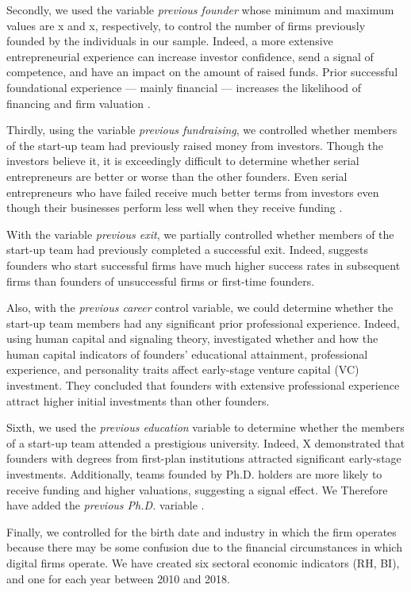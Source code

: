 \documentclass[12pt]{article}
\begin{document}
Secondly, we used the variable \textit{previous founder} whose minimum and maximum values are x and x, respectively, to control the number of firms previously founded by the individuals in our sample. Indeed, a more extensive entrepreneurial experience can increase investor confidence, send a signal of competence, and have an impact on the amount of raised funds. Prior successful foundational experience — mainly financial — increases the likelihood of financing and firm valuation \citep{hsu2007experienced}.

Thirdly, using the variable \textit{previous fundraising}, we controlled whether members of the start-up team had previously raised money from investors. Though the investors believe it, it is exceedingly difficult to determine whether serial entrepreneurs are better or worse than the other founders. Even serial entrepreneurs who have failed receive much better terms from investors even though their businesses perform less well when they receive funding \citep{nahata2019success}.

With the variable \textit{previous exit}, we partially controlled whether members of the start-up team had previously completed a successful exit. Indeed, \citet{gompers2010performance} suggests founders who start successful firms have much higher success rates in subsequent firms than founders of unsuccessful firms or first-time founders.

Also, with the \textit{previous career} control variable, we could determine whether the start-up team members had any significant prior professional experience. Indeed, using human capital and signaling theory,  \citet{subramanian2022backing} investigated whether and how the human capital indicators of founders' educational attainment, professional experience, and personality traits affect early-stage venture capital (VC) investment. They concluded that founders with extensive professional experience attract higher initial investments than other founders.

Sixth, we used the \textit{previous education} variable to determine whether the members of a start-up team attended a prestigious university. Indeed, X demonstrated that founders with degrees from first-plan institutions attracted significant early-stage investments. Additionally, teams founded by Ph.D. holders are more likely to receive funding and higher valuations, suggesting a signal effect. We Therefore have added the \textit{previous Ph.D.} variable \citep{hsu2007experienced}.

Finally, we controlled for the birth date and industry in which the firm operates because there may be some confusion due to the financial circumstances in which digital firms operate. We have created six sectoral economic indicators (RH, BI), and one for each year between 2010 and 2018.
\end{document}
